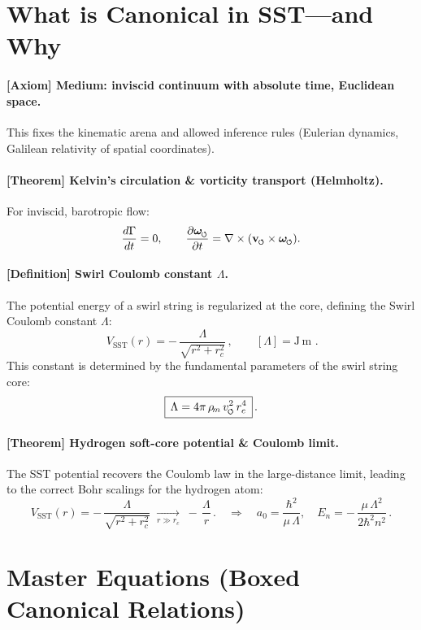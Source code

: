 \documentclass[11pt]{article}
\newcommand{\swirlarrow}{%
    \mathchoice{\mkern-2mu\scriptstyle\boldsymbol{\circlearrowleft}}%
    {\mkern-2mu\scriptstyle\boldsymbol{\circlearrowleft}}%
    {\mkern-2mu\scriptscriptstyle\boldsymbol{\circlearrowleft}}%
    {\mkern-2mu\scriptscriptstyle\boldsymbol{\circlearrowleft}}%
}
\newcommand{\vswirl}{\mathbf{v}_{\swirlarrow}}
\newcommand{\omegas}{\boldsymbol{\omega}_{\swirlarrow}}  %
\newcommand{\vscore}{v_{\swirlarrow}}                    %
\newcommand{\rhom}{\rho_{\!m}}                           %
\newcommand{\rc}{r_c}                                    %
\begin{document}
\section{What is Canonical in SST—and Why}
\label{sec:canonical_overview}
\paragraph{[Axiom] Medium: inviscid continuum with absolute time, Euclidean space.}
    This fixes the kinematic arena and allowed inference rules (Eulerian dynamics, Galilean relativity of spatial coordinates).

\paragraph{[Theorem] Kelvin’s circulation \& vorticity transport (Helmholtz).}
    For inviscid, barotropic flow:
    \[
        \frac{d\Gamma}{dt}=0,\qquad
        \pdv{\omegas}{t}=\nabla\times(\vswirl\times\omegas).
    \]

\paragraph{[Definition] Swirl Coulomb constant $\Lambda$.}
    The potential energy of a swirl string is regularized at the core, defining the Swirl Coulomb constant $\Lambda$:
    \[
        \boxed{\,V_{\text{SST}}(r)=-\,\frac{\Lambda}{\sqrt{r^2+\rc^2}}\,,\qquad [\Lambda]=\mathrm{J\,m}\,}\,.
    \]
    This constant is determined by the fundamental parameters of the swirl string core:
    \[
        \boxed{\,\Lambda = 4\pi\,\rhom\,\vscore^2\,\rc^4\,}\,.
    \]

\paragraph{[Theorem] Hydrogen soft-core potential \& Coulomb limit.}
    The SST potential recovers the Coulomb law in the large-distance limit, leading to the correct Bohr scalings for the hydrogen atom:
    \[
        V_{\text{SST}}(r)=-\,\frac{\Lambda}{\sqrt{r^2+\rc^2}}
        \;\xrightarrow[r\gg \rc]{}\;
        -\,\frac{\Lambda}{r}\,. \quad\Rightarrow\quad
        a_0=\frac{\hbar^2}{\mu\,\Lambda}, \quad E_n=-\,\frac{\mu\,\Lambda^2}{2\hbar^2 n^2}\,.
    \]

\section{Master Equations (Boxed Canonical Relations)}
\label{sec:master_equations}
\end{document}
